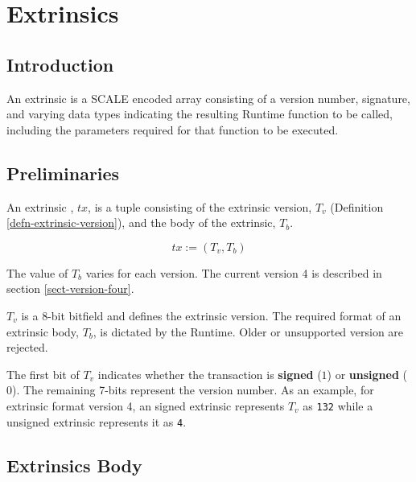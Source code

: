 \newpage
\chapter{Extrinsics}

\section{Introduction}

An extrinsic is a SCALE encoded array consisting of a version number,
signature, and varying data types indicating the resulting Runtime function to
be called, including the parameters required for that function to be executed.
\newline

\section{Preliminaries}

\begin{definition}
    An extrinsic , $tx$, is a tuple consisting of the extrinsic version,
    $T_v$ (Definition \ref{defn-extrinsic-version}), and the body of the extrinsic, $T_b$.

    \[
        tx := (T_v, T_b)
    \]

    The value of $T_b$ varies for each version. The current version 4 is
    described in section \ref{sect-version-four}.
\end{definition}

\begin{definition}
    \label{defn-extrinsic-version}
    $T_v$ is a 8-bit bitfield and defines the extrinsic version. The required
    format of an extrinsic body, $T_b$, is dictated by the Runtime. Older or
    unsupported version are rejected.
    \newline

    The first bit of $T_v$ indicates whether the transaction is \textbf{signed}
    ($1$) or \textbf{unsigned} ($0$). The remaining 7-bits represent the version
    number. As an example, for extrinsic format version 4, an signed extrinsic
    represents $T_v$ as \verb|132| while a unsigned extrinsic represents it as
    \verb|4|.
\end{definition}

\section{Extrinsics Body}

